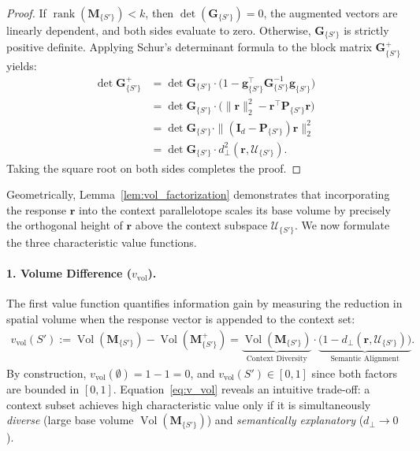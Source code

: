 \documentclass{article}
\begin{document}
\begin{proof}
If $\operatorname{rank}(\mathbf{M}_{\{S'\}}) < k$, then $\operatorname{det}(\mathbf{G}_{\{S'\}}) = 0$, the augmented vectors are linearly dependent, and both sides evaluate to zero. Otherwise, $\mathbf{G}_{\{S'\}}$ is strictly positive definite. Applying Schur's determinant formula to the block matrix $\mathbf{G}^{+}_{\{S'\}}$ yields:
\begin{align*}
    \det \mathbf{G}^{+}_{\{S'\}} &= \det \mathbf{G}_{\{S'\}} \cdot \big(1 - \mathbf{g}_{\{S'\}}^\top \mathbf{G}_{\{S'\}}^{-1} \mathbf{g}_{\{S'\}}\big) \\
    &= \det \mathbf{G}_{\{S'\}} \cdot \big(\|\mathbf{r}\|_2^2 - \mathbf{r}^\top \mathbf{P}_{\{S'\}} \mathbf{r}\big) \\
    &= \det \mathbf{G}_{\{S'\}} \cdot \|(\mathbf{I}_d - \mathbf{P}_{\{S'\}}) \mathbf{r}\|_2^2 \\
    &= \det \mathbf{G}_{\{S'\}} \cdot d_{\perp}^2(\mathbf{r}, \mathcal{U}_{\{S'\}}).
\end{align*}
Taking the square root on both sides completes the proof.
\end{proof}

Geometrically, Lemma~\ref{lem:vol_factorization} demonstrates that incorporating the response $\mathbf{r}$ into the context parallelotope scales its base volume by precisely the orthogonal height of $\mathbf{r}$ above the context subspace $\mathcal{U}_{\{S'\}}$. We now formulate the three characteristic value functions.

\paragraph{1. Volume Difference ($v_{\text{vol}}$).}
The first value function quantifies information gain by measuring the reduction in spatial volume when the response vector is appended to the context set:
\begin{align}\label{eq:v_vol}
    v_{\text{vol}}(S') := \operatorname{Vol}(\mathbf{M}_{\{S'\}}) - \operatorname{Vol}(\mathbf{M}^{+}_{\{S'\}}) = \underbrace{\operatorname{Vol}(\mathbf{M}_{\{S'\}})}_{\text{Context Diversity}} \cdot \underbrace{\big(1 - d_{\perp}(\mathbf{r}, \mathcal{U}_{\{S'\}})\big)}_{\text{Semantic Alignment}}.
\end{align}
By construction, $v_{\text{vol}}(\emptyset) = 1 - 1 = 0$, and $v_{\text{vol}}(S') \in [0, 1]$ since both factors are bounded in $[0, 1]$. Equation~\eqref{eq:v_vol} reveals an intuitive trade-off: a context subset achieves high characteristic value only if it is simultaneously \emph{diverse} (large base volume $\operatorname{Vol}(\mathbf{M}_{\{S'\}})$) and \emph{semantically explanatory} ($d_{\perp} \to 0$). 
\end{document}
